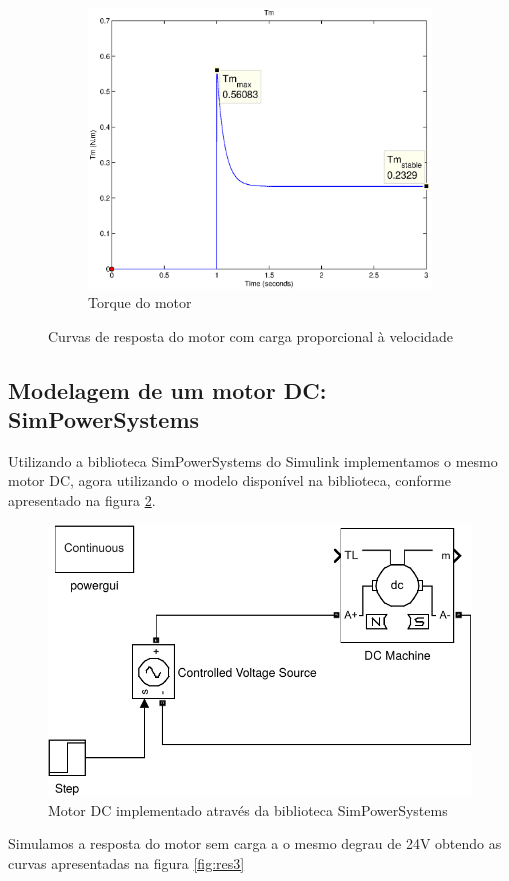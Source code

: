 \documentclass{article}
\begin{document}
\begin{figure}[H]
\begin{subfigure}[b]{0.49\linewidth}
		\centering
		\includegraphics[width=\linewidth]{matlab/tm2}
		\caption{Torque do motor}
	\end{subfigure}
	\caption{Curvas de resposta do motor com carga proporcional à velocidade}
	\label{fig:res2}
\end{figure}

\subsection{Modelagem de um motor DC: SimPowerSystems}
Utilizando a biblioteca SimPowerSystems do Simulink implementamos o mesmo motor DC, agora utilizando o modelo disponível na biblioteca, conforme apresentado na figura \ref{fig:sim2}.
\begin{figure}[H]
	\centering
	\includegraphics[width=0.6\linewidth]{matlab/sim2}
	\caption{Motor DC implementado através da biblioteca SimPowerSystems}
	\label{fig:sim2}
\end{figure}

Simulamos a resposta do motor sem carga a o mesmo degrau de 24V obtendo as curvas apresentadas na figura \ref{fig:res3}
\end{document}
